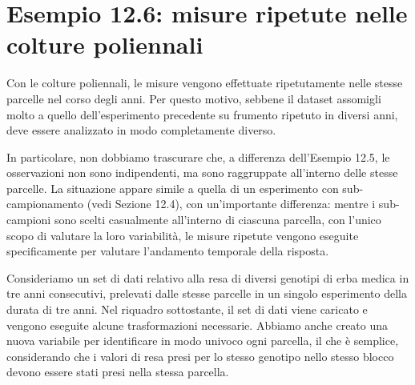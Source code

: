 \documentclass[
  12pt,
]{book}
\begin{document}
\hypertarget{esempio-12.6-misure-ripetute-nelle-colture-poliennali}{%
\section{Esempio 12.6: misure ripetute nelle colture poliennali}\label{esempio-12.6-misure-ripetute-nelle-colture-poliennali}}

Con le colture poliennali, le misure vengono effettuate ripetutamente nelle stesse parcelle nel corso degli anni. Per questo motivo, sebbene il dataset assomigli molto a quello dell'esperimento precedente su frumento ripetuto in diversi anni, deve essere analizzato in modo completamente diverso.

In particolare, non dobbiamo trascurare che, a differenza dell'Esempio 12.5, le osservazioni non sono indipendenti, ma sono raggruppate all'interno delle stesse parcelle. La situazione appare simile a quella di un esperimento con sub-campionamento (vedi Sezione 12.4), con un'importante differenza: mentre i sub-campioni sono scelti casualmente all'interno di ciascuna parcella, con l'unico scopo di valutare la loro variabilità, le misure ripetute vengono eseguite specificamente per valutare l'andamento temporale della risposta.

Consideriamo un set di dati relativo alla resa di diversi genotipi di erba medica in tre anni consecutivi, prelevati dalle stesse parcelle in un singolo esperimento della durata di tre anni. Nel riquadro sottostante, il set di dati viene caricato e vengono eseguite alcune trasformazioni necessarie. Abbiamo anche creato una nuova variabile per identificare in modo univoco ogni parcella, il che è semplice, considerando che i valori di resa presi per lo stesso genotipo nello stesso blocco devono essere stati presi nella stessa parcella.
\end{document}
